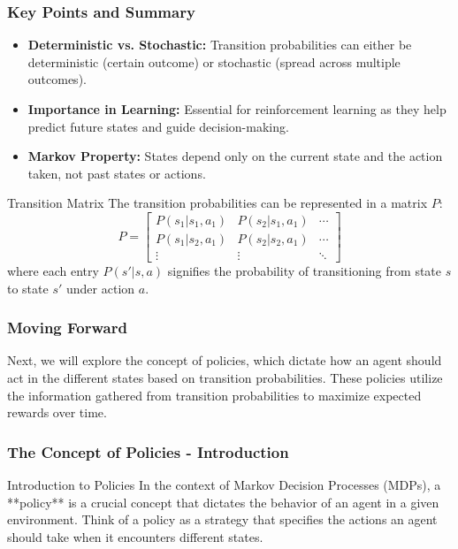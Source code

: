 \documentclass[aspectratio=169]{beamer}
\begin{document}
\begin{frame}[fragile]
    \frametitle{Key Points and Summary}
    \begin{itemize}
        \item \textbf{Deterministic vs. Stochastic:} Transition probabilities can either be deterministic (certain outcome) or stochastic (spread across multiple outcomes).
        \item \textbf{Importance in Learning:} Essential for reinforcement learning as they help predict future states and guide decision-making.
        \item \textbf{Markov Property:} States depend only on the current state and the action taken, not past states or actions.
    \end{itemize}

    \begin{block}{Transition Matrix}
        The transition probabilities can be represented in a matrix \( P \):
        \[
        P = 
        \begin{bmatrix}
        P(s_1 | s_1, a_1) & P(s_2 | s_1, a_1) & \cdots \\
        P(s_1 | s_2, a_1) & P(s_2 | s_2, a_1) & \cdots \\
        \vdots & \vdots & \ddots
        \end{bmatrix}
        \]
        where each entry \( P(s' | s, a) \) signifies the probability of transitioning from state \( s \) to state \( s' \) under action \( a \).
    \end{block}
\end{frame}

\begin{frame}[fragile]
    \frametitle{Moving Forward}
    Next, we will explore the concept of policies, which dictate how an agent should act in the different states based on transition probabilities. These policies utilize the information gathered from transition probabilities to maximize expected rewards over time.
\end{frame}

\begin{frame}[fragile]
    \frametitle{The Concept of Policies - Introduction}
    \begin{block}{Introduction to Policies}
        In the context of Markov Decision Processes (MDPs), a **policy** is a crucial concept that dictates the behavior of an agent in a given environment. 
        Think of a policy as a strategy that specifies the actions an agent should take when it encounters different states. 
    \end{block}
\end{frame}
\end{document}
